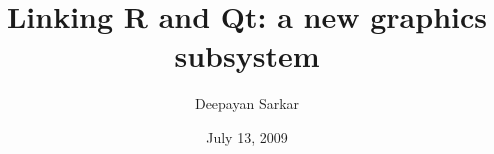 \usepackage{times}
\usepackage[T1]{fontenc}

\title{Linking R and Qt: a new graphics subsystem}

\author{Deepayan Sarkar}
\date{July 13, 2009}




\usepackage{Sweave}
\usepackage{SweaveBeamer}
\usepackage{alltt}
\usepackage{amsmath}
\usepackage{amsfonts}
\usepackage{amssymb}
\usepackage{amsthm}
\usepackage{bm}
\usepackage{graphicx}
\usepackage{url}
\usepackage{hyperref}


\newcommand{\R}{\Emph{R}\xspace}
\newcommand{\SPLUS}{\Emph{S-PLUS}}
\newcommand{\Emph}[1]{\emph{\color{Scode}#1}}
\newcommand{\trans}{\ensuremath{^\prime}}


\newcommand{\lattice}{\code{lattice}}
\newcommand{\Rpackage}[1]{\code{#1}}
\newcommand{\Rfunction}[1]{\code{#1()}}
\newcommand{\class}[1]{\textit{``#1''}}




